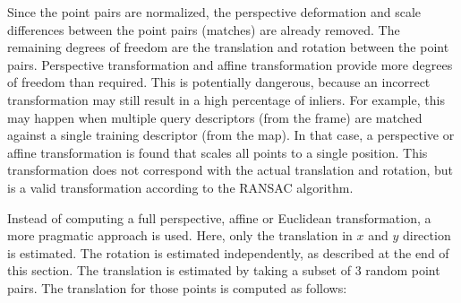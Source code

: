Since the point pairs are normalized,
the perspective deformation and scale differences between the point pairs (matches) are already removed.
The remaining degrees of freedom are the translation and rotation between the point pairs. 
Perspective transformation and affine transformation provide more degrees of freedom than required.
This is potentially dangerous, because an incorrect transformation may still result in a high percentage of inliers.
For example, this may happen when multiple query descriptors (from the frame) are matched against a single training descriptor (from the map).
In that case, a perspective or affine transformation is found that scales all points to a single position.
This transformation does not correspond with the actual translation and rotation, but is a valid transformation according to the RANSAC algorithm.

Instead of computing a full perspective, affine or Euclidean transformation, a more pragmatic approach is used.
Here, only the translation in $x$ and $y$ direction is estimated.
The rotation is estimated independently, as described at the end of this section.
The translation is estimated by taking a subset of 3 random point pairs.
The translation for those points is computed as follows:

